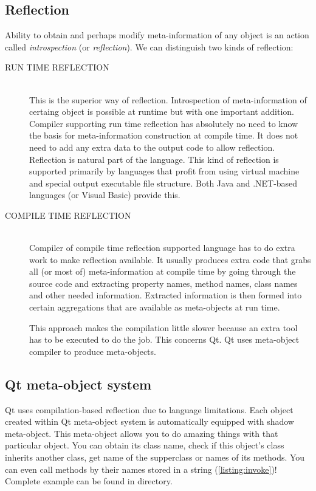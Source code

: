\subsection{Reflection}
Ability to obtain and perhaps modify meta-information of any object is an action called \textit{introspection} (or \textit{reflection}). We can distinguish two kinds of reflection:
\begin{description}
\item[RUN TIME REFLECTION] \hfill \\
This is the superior way of reflection. Introspection of meta-information of certaing object is possible at runtime but with one important addition. Compiler supporting run time reflection has absolutely no need to know the basis for meta-information construction at compile time. It does not need to add any extra data to the output code to allow reflection. Reflection is natural part of the language. This kind of reflection is supported primarily by languages that profit from using virtual machine and special output executable file structure. Both Java and .NET-based languages (\eg \csharp or Visual Basic) provide this.
\item[COMPILE TIME REFLECTION] \hfill \\
Compiler of compile time reflection supported language has to do extra work to make reflection available. It usually produces extra code that grabs all (or most of) meta-information at compile time by going through the source code and extracting property names, method names, class names and other needed information. Extracted information is then formed into certain aggregations that are available as meta-objects at run time.

This approach makes the compilation little slower because an extra tool has to be executed to do the job. This concerns Qt. Qt uses meta-object compiler to produce meta-objects.
\end{description}

\subsection{Qt meta-object system}
Qt uses compilation-based reflection due to \cpp language limitations. Each object created within Qt meta-object system is automatically equipped with shadow meta-object. This meta-object allows you to do amazing things with that particular object. You can obtain its class name, check if this object's class inherits another class, get name of the supperclass or names of its methods. You can even call methods by their names stored in a string (\autoref{listing:invoke})! Complete example can be found in directory.

